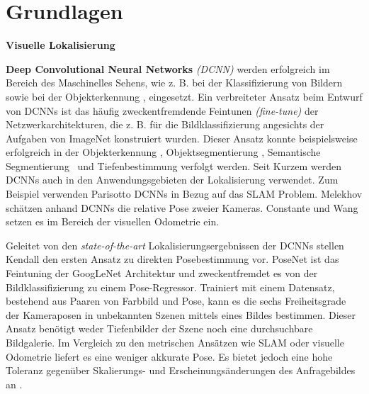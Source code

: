 \pagebreak
\section{Grundlagen}





\pagebreak
\textbf{Visuelle Lokalisierung}

\textbf{Deep Convolutional Neural Networks} \textit{(DCNN)} werden erfolgreich im Bereich des Maschinelles Sehens, wie z. B. bei der Klassifizierung von Bildern \cite{krizhevskyImageNetClassificationDeep2012, simonyanVeryDeepConvolutional2014, heDeepResidualLearning2015} sowie bei der  Objekterkennung \cite{girshickRichFeatureHierarchies2013, renFasterRCNNRealTime2015b, girshickFastRCNN2015},  eingesetzt. 
Ein verbreiteter Ansatz beim Entwurf von DCNNs ist das häufig zweckentfremdende Feintunen \textit{(fine-tune)} der Netzwerkarchitekturen, die z. B. für die Bildklassifizierung angesichts der Aufgaben von ImageNet \cite{russakovskyImageNetLargeScale2014} konstruiert wurden. Dieser Ansatz konnte beispielsweise erfolgreich in der Objekterkennung \cite{girshickFastRCNN2015}, Objektsegmentierung \cite{kokkinosPushingBoundariesBoundary2015, maninisConvolutionalOrientedBoundaries2016}, Semantische Segmentierung \cite{nohLearningDeconvolutionNetwork2015, hazirbasFuseNetIncorporatingDepth2017a} und Tiefenbestimmung \cite{liDepthSurfaceNormal2015} verfolgt werden.
Seit Kurzem werden DCNNs auch in den Anwendungsgebieten der Lokalisierung verwendet. Zum Beispiel verwenden Parisotto \etal\cite{parisottoGlobalPoseEstimation2018} DCNNs in Bezug auf das SLAM Problem. Melekhov \etal\cite{melekhovRelativeCameraPose2017} schätzen anhand DCNNs die relative Pose zweier Kameras. Constante \etal\cite{costanteExploringRepresentationLearning2016} und Wang \etal\cite{wangDeepVOEndtoendVisual2017} setzen es im Bereich der visuellen Odometrie ein.

Geleitet von den \textit{state-of-the-art} Lokalisierungsergebnissen der DCNNs stellen Kendall \etal\cite{kendallPoseNetConvolutionalNetwork2015} den ersten Ansatz zu direkten Posebestimmung  vor. PoseNet \cite{kendallPoseNetConvolutionalNetwork2015} ist das Feintuning der GoogLeNet \cite{szegedyGoingDeeperConvolutions2015} Architektur und zweckentfremdet es von der Bildklassifizierung zu einem Pose-Regressor. Trainiert mit einem Datensatz, bestehend aus Paaren von Farbbild und Pose, kann es die sechs Freiheitsgrade der Kameraposen in unbekannten Szenen mittels eines Bildes bestimmen. Dieser Ansatz benötigt weder Tiefenbilder der Szene noch eine durchsuchbare Bildgalerie. Im Vergleich zu den metrischen Ansätzen wie SLAM oder visuelle Odometrie liefert es eine weniger akkurate Pose. Es bietet jedoch eine hohe Toleranz gegenüber Skalierungs- und Erscheinungsänderungen des Anfragebildes an \cite{piascoSurveyVisualBasedLocalization2018}.

